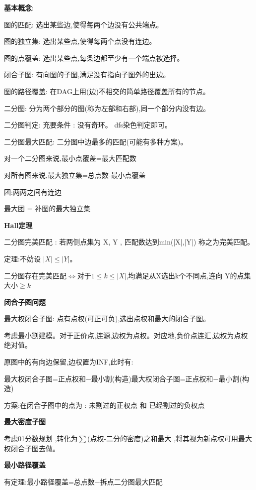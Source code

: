 \documentclass[a4paper, fontset=none]{ctexart}
\begin{document}
\textbf{基本概念}:

图的匹配: 选出某些边,使得每两个边没有公共端点。

图的独立集: 选出某些点,使得每两个点没有连边。

图的点覆盖: 选出某些点,每条边都至少有一个端点被选择。

闭合子图: 有向图的子图,满足没有指向子图外的出边。

图的路径覆盖: 在DAG上用(边)不相交的简单路径覆盖所有的节点。

二分图: 分为两个部分的图(称为左部和右部),同一个部分内没有边。

二分图判定: 充要条件 : 没有奇环。 dfs染色判定即可。

二分图最大匹配: 二分图中边最多的匹配(可能有多种方案)。

对一个二分图来说,最小点覆盖=最大匹配数

对所有图来说,最大独立集=总点数-最小点覆盖

团:两两之间有连边

最大团 = 补图的最大独立集




\textbf{Hall定理}



二分图完美匹配 : 若两侧点集为 X, Y , 匹配数达到min(|X|,|Y|) 称之为完美匹配。

定理:不妨设 $|X|\leqslant |Y|$。

二分图存在完美匹配$\iff$对于$1\leqslant k\leqslant |X|$,均满足从X选出k个不同点,连向 Y的点集大小$\geqslant k$



\textbf{闭合子图问题}

最大权闭合子图: 点有点权(可正可负),选出点权和最大的闭合子图。

考虑最小割建模。对于正价点,连源,边权为点权。对应地,负价点连汇,边权为点权绝对值。

原图中的有向边保留,边权置为INF,此时有:

最大权闭合子图=正点权和−最小割(构造)最大权闭合子图=正点权和−最小割(构造)

方案:在闭合子图中的点为 : 未割过的正权点 \quad 和 \quad 已经割过的负权点



\textbf{最大密度子图}

考虑01分数规划 ,转化为$\sum$(点权-二分的密度)之和最大 ,将其视为新点权可用最大权闭合子图去做。



\textbf{最小路径覆盖}

有定理:最小路径覆盖=总点数−拆点二分图最大匹配
\end{document}
